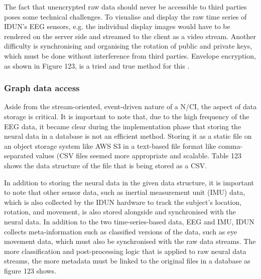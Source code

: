 
The fact that unencrypted raw data should never be accessible to third parties poses some technical challenges. To visualise and display the raw time series of IDUN's EEG sensors, e.g. the individual display images would have to be rendered on the server side and streamed to the client as a video stream. Another difficulty is synchronising and organising the rotation of public and private keys, which must be done without interference from third parties. Envelope encryption, as shown in Figure 123, is a tried and true method for this \citep{google_cloud_envelope_nodate}.


\subsubsection{Graph data access}
\label{chapter5-graph-data-access}

Aside from the stream-oriented, event-driven nature of a N/CI, the aspect of data storage is critical. It is important to note that, due to the high frequency of the EEG data, it became clear during the implementation phase that storing the neural data in a database is not an efficient method. Storing it as a static file on an object storage system like AWS S3 in a text-based file format like comma-separated values (CSV files seemed more appropriate and scalable. Table 123 shows the data structure of the file that is being stored as a CSV.


In addition to storing the neural data in the given data structure, it is important to note that other sensor data, such as inertial measurement unit (IMU) data, which is also collected by the IDUN hardware to track the subject's location, rotation, and movement, is also stored alongside and synchronised with the neural data. In addition to the two time-series-based data, EEG and IMU, IDUN collects meta-information such as classified versions of the data, such as eye movement data, which must also be synchronised with the raw data streams. The more classification and post-processing logic that is applied to raw neural data streams, the more metadata must be linked to the original files in a database as figure 123 shows.



